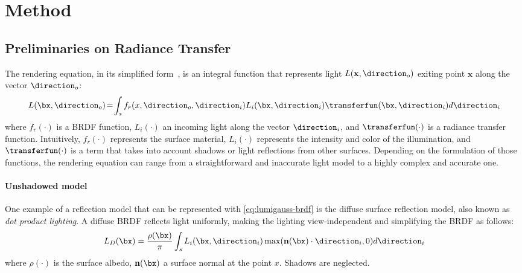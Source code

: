 
\section{Method}
  \label{sec:lumigauss-method}

  \subsection{Preliminaries on Radiance Transfer}
    \label{subsec:lumigauss-preliminaries}
    The rendering equation, in its simplified form~\cite{green2003grittydetail}, is an integral function that represents light $L(\mathbf{x}, \direction_o)$ exiting point $\mathbf{x}$ along the vector $\direction_o$:
    \begin{equation}
      \label{eq:lumigauss-brdf}
      L(\bx, \direction_o)\!
      =\!\int_{s} f_r(x, \direction_o, \direction_i) L_i(\bx, \direction_i) \transferfun(\bx, \direction_i) d\direction_i
    \end{equation}
    where $f_r(\cdot)$ is a BRDF function, $L_i(\cdot)$ an incoming light along the vector $\direction_i$, and $\transferfun(\cdot)$ is a radiance transfer function.
    Intuitively, $f_r(\cdot)$ represents the surface material, $L_i(\cdot)$
    represents the intensity and color of the illumination, and
    $\transferfun(\cdot)$ is a term that takes into account shadows or light
    reflections from other surfaces.
    Depending on the formulation of those functions, the rendering equation can
    range from a straightforward and inaccurate light model to a highly complex
    and accurate one.

    \paragraph{Unshadowed model}
      One example of a reflection model that can be represented with
      \cref{eq:lumigauss-brdf} is the diffuse surface reflection model, also known
      as \textit{dot product lighting}.
      A diffuse BRDF reflects light uniformly, making the lighting view-independent and simplifying the BRDF as follows:
      \begin{equation}
        \label{eq:lumigauss-dotillum}
        L_{D}(\bx) = \frac{\rho(\bx)}{\pi} \int_{s} L_i(\bx, \direction_i)
        \max(\mathbf{n}(\bx) \cdot \direction_i, 0) d\direction_i \end{equation} where
      $\rho(\cdot)$ is the surface albedo, $\mathbf{n}(\bx)$ a surface normal at the
      point $x$.
      Shadows are neglected.

